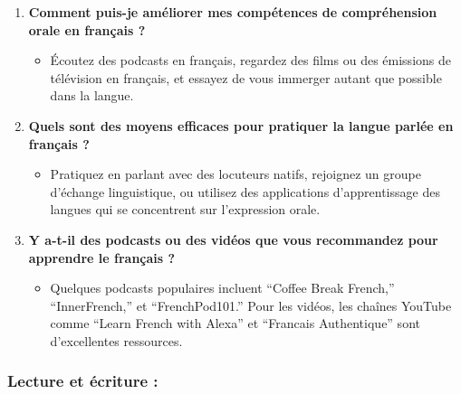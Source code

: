 \documentclass[
  16pt,
  letterpaper,
  DIV=11,
  numbers=noendperiod]{scrartcl}
\providecommand{\tightlist}{%
  \setlength{\itemsep}{0pt}\setlength{\parskip}{0pt}}\usepackage{longtable,booktabs,array}
\begin{document}
\begin{enumerate}
\def\labelenumi{\arabic{enumi}.}
\setcounter{enumi}{5}
\tightlist
\item
  \textbf{Comment puis-je améliorer mes compétences de compréhension
  orale en français ?}

  \begin{itemize}
  \tightlist
  \item
    Écoutez des podcasts en français, regardez des films ou des
    émissions de télévision en français, et essayez de vous immerger
    autant que possible dans la langue.
  \end{itemize}
\item
  \textbf{Quels sont des moyens efficaces pour pratiquer la langue
  parlée en français ?}

  \begin{itemize}
  \tightlist
  \item
    Pratiquez en parlant avec des locuteurs natifs, rejoignez un groupe
    d'échange linguistique, ou utilisez des applications d'apprentissage
    des langues qui se concentrent sur l'expression orale.
  \end{itemize}
\item
  \textbf{Y a-t-il des podcasts ou des vidéos que vous recommandez pour
  apprendre le français ?}

  \begin{itemize}
  \tightlist
  \item
    Quelques podcasts populaires incluent ``Coffee Break French,''
    ``InnerFrench,'' et ``FrenchPod101.'' Pour les vidéos, les chaînes
    YouTube comme ``Learn French with Alexa'' et ``Francais
    Authentique'' sont d'excellentes ressources.
  \end{itemize}
\end{enumerate}

\subsubsection{Lecture et écriture :}\label{lecture-et-uxe9criture}
\end{document}
